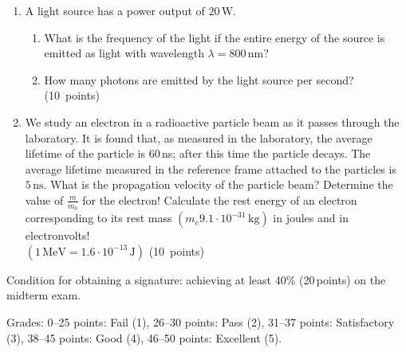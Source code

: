 \documentclass[12pt]{letter}
\begin{document}
\begin{enumerate}
\bigskip
\item A light source has a power output of $20\,\text{W}$.
\begin{enumerate}
    \item What is the frequency of the light if the entire energy of the source is emitted as light with wavelength $\lambda = 800\,\text{nm}$?
    \item How many photons are emitted by the light source per second? \hfill (10~points)
\end{enumerate}


\bigskip
\item We study an electron in a radioactive particle beam as it passes through the laboratory. It is found that, as measured in the laboratory, the average lifetime of the particle is 60\,ns; after this time the particle decays. The average lifetime measured in the reference frame attached to the particles is $5\,\text{ns}$. What is the propagation velocity of the particle beam? Determine the value of $\frac{m}{m_0}$ for the electron! Calculate the rest energy of an electron corresponding to its rest mass $(m_{e}9.1 \cdot 10^{-31}\,\text{kg})$ in joules and in electronvolts! \\ $(1\,\text{MeV} = 1.6 \cdot 10^{-13}\,\text{J})$ \hfill (10~points)
\end{enumerate}


Condition for obtaining a signature: achieving at least 40\% (20\,points) on the midterm exam.

Grades: 0–25 points: Fail (1), 26–30 points: Pass (2), 31–37 points: Satisfactory (3), 38–45 points: Good (4), 46–50 points: Excellent (5).


\vfill
\end{document}
